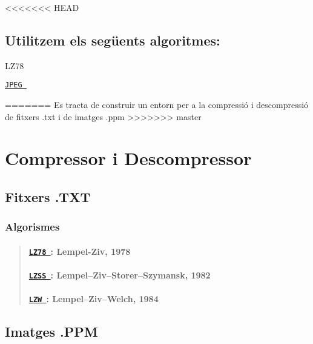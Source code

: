 <<<<<<< HEAD
\subsection*{Utilitzem els següents algoritmes\+:}


\begin{DoxyEnumerate}
\item L\+Z78
\item \href{./classdomini_1_1algorithm_1_1JPEG.html}{\tt J\+P\+EG }
\end{DoxyEnumerate}
=======
Es tracta de construir un entorn per a la compressió i descompressió de fitxers .txt i de imatges .ppm
>>>>>>> master

\section*{Compressor i Descompressor}

\subsection*{Fitxers .T\+XT}

\subsubsection*{Algorismes}

\begin{quote}
\paragraph*{\href{./classdomini_1_1algorithm_1_1LZ78.html}{\tt L\+Z78 }\+: Lempel-\/\+Ziv, 1978}

\paragraph*{\href{./classdomini_1_1algorithm_1_1LZSS.html}{\tt L\+Z\+SS }\+: Lempel–\+Ziv–\+Storer–\+Szymansk, 1982}

\paragraph*{\href{./classdomini_1_1algorithm_1_1LZW.html}{\tt L\+ZW }\+: Lempel–\+Ziv–\+Welch, 1984}

\end{quote}
\subsection*{Imatges .P\+PM}

